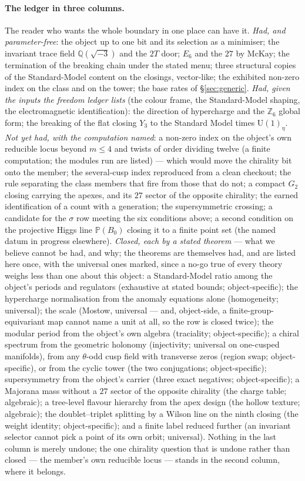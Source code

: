 \documentclass[11pt,a4paper]{article}
\theoremstyle{definition}
\theoremstyle{remark}
\newcommand{\Q}{\mathbb{Q}}
\newcommand{\Z}{\mathbb{Z}}
\newcommand{\PP}{\mathbb{P}}
\begin{document}
\paragraph{The ledger in three columns.} The reader who wants the whole boundary in one place can have it. \emph{Had, and parameter-free}: the object up to one bit and its selection as a minimiser; the invariant trace field $\Q(\sqrt{-3})$ and the $2T$ door; $E_6$ and the $27$ by McKay; the termination of the breaking chain under the stated menu; three structural copies of the Standard-Model content on the closings, vector-like; the exhibited non-zero index on the class and on the tower; the base rates of \S\ref{sec:generic}. \emph{Had, given the inputs the freedom ledger lists} (the colour frame, the Standard-Model shaping, the electromagnetic identification): the direction of hypercharge and the $\Z_6$ global form; the breaking of the flat closing $Y_3$ to the Standard Model times $\mathrm{U}(1)_\eta$. \emph{Not yet had, with the computation named}: a non-zero index on the object's own reducible locus beyond $m \le 4$ and twists of order dividing twelve (a finite computation; the modules run are listed) --- which would move the chirality bit onto the member; the several-cusp index reproduced from a clean checkout; the rule separating the class members that fire from those that do not; a compact $G_2$ closing carrying the apexes, and its $27$ sector of the opposite chirality; the earned identification of a count with a generation; the supersymmetric crossing; a candidate for the $\sigma$ row meeting the six conditions above; a second condition on the projective Higgs line $\PP(B_0)$ closing it to a finite point set (the named datum in progress elsewhere). \emph{Closed, each by a stated theorem} --- what we believe cannot be had, and why; the theorems are themselves had, and are listed here once, with the universal ones marked, since a no-go true of every theory weighs less than one about this object: a Standard-Model ratio among the object's periods and regulators (exhaustive at stated bounds; object-specific); the hypercharge normalisation from the anomaly equations alone (homogeneity; universal); the scale (Mostow, universal --- and, object-side, a finite-group-equivariant map cannot name a unit at all, so the row is closed twice); the modular period from the object's own algebra (traciality; object-specific); a chiral spectrum from the geometric holonomy (injectivity; universal on one-cusped manifolds), from any $\theta$-odd cusp field with transverse zeros (region swap; object-specific), or from the cyclic tower (the two conjugations; object-specific); supersymmetry from the object's carrier (three exact negatives; object-specific); a Majorana mass without a $27$ sector of the opposite chirality (the charge table; algebraic); a tree-level flavour hierarchy from the apex design (the hollow texture; algebraic); the doublet--triplet splitting by a Wilson line on the ninth closing (the weight identity; object-specific); and a finite label reduced further (an invariant selector cannot pick a point of its own orbit; universal). Nothing in the last column is merely undone; the one chirality question that is undone rather than closed --- the member's own reducible locus --- stands in the second column, where it belongs.
\end{document}
